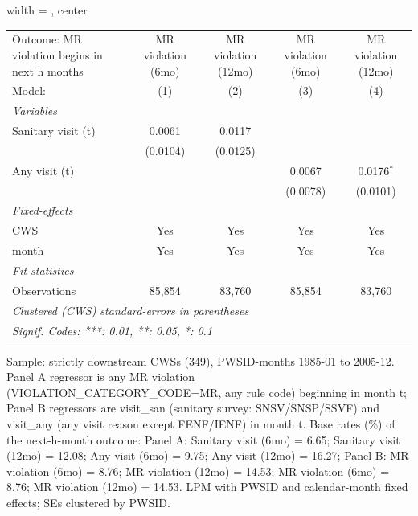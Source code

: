 \begin{table}[htbp]
\begin{adjustbox}{width = \textwidth, center}
\begin{tabular}{lcccc}
   Outcome: MR violation begins in next h months & MR violation (6mo) & MR violation (12mo) & MR violation (6mo) & MR violation (12mo) \\   
   Model:                                        & (1)                & (2)                 & (3)                & (4)\\  
   \midrule
   \emph{Variables}\\
   Sanitary visit (t)                            & 0.0061             & 0.0117              &                    &   \\   
                                                 & (0.0104)           & (0.0125)            &                    &   \\   
   Any visit (t)                                 &                    &                     & 0.0067             & 0.0176$^{*}$\\   
                                                 &                    &                     & (0.0078)           & (0.0101)\\   
   \midrule
   \emph{Fixed-effects}\\
   CWS                                           & Yes                & Yes                 & Yes                & Yes\\  
   month                                         & Yes                & Yes                 & Yes                & Yes\\  
   \midrule
   \emph{Fit statistics}\\
   Observations                                  & 85,854             & 83,760              & 85,854             & 83,760\\  
   \midrule \midrule
   \multicolumn{5}{l}{\emph{Clustered (CWS) standard-errors in parentheses}}\\
   \multicolumn{5}{l}{\emph{Signif. Codes: ***: 0.01, **: 0.05, *: 0.1}}\\
\end{tabular}
\par\endgroup
\end{adjustbox}
{\tiny\linespread{1}\selectfont \par \raggedright 
Sample: strictly downstream CWSs (349), PWSID-months 1985-01 to 2005-12. Panel A regressor is any MR violation (VIOLATION\_CATEGORY\_CODE=MR, any rule code) beginning in month t; Panel B regressors are visit\_san (sanitary survey: SNSV/SNSP/SSVF) and visit\_any (any visit reason except FENF/IENF) in month t. Base rates (\%) of the next-h-month outcome: Panel A: Sanitary visit (6mo) = 6.65; Sanitary visit (12mo) = 12.08; Any visit (6mo) = 9.75; Any visit (12mo) = 16.27; Panel B: MR violation (6mo) = 8.76; MR violation (12mo) = 14.53; MR violation (6mo) = 8.76; MR violation (12mo) = 14.53. LPM with PWSID and calendar-month fixed effects; SEs clustered by PWSID.
}
\end{table}
